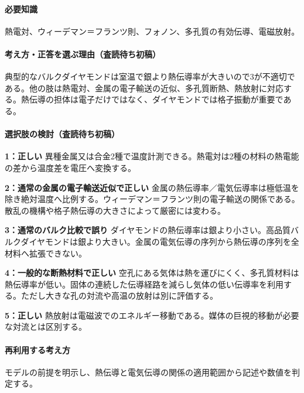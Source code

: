 \paragraph{必要知識} 熱電対、ウィーデマン＝フランツ則、フォノン、多孔質の有効伝導、電磁放射。

\paragraph{考え方・正答を選ぶ理由（査読待ち初稿）} 典型的なバルクダイヤモンドは室温で銀より熱伝導率が大きいので3が不適切である。他の肢は熱電対、金属の電子輸送の近似、多孔質断熱、熱放射に対応する。熱伝導の担体は電子だけではなく、ダイヤモンドでは格子振動が重要である。

\paragraph{選択肢の検討（査読待ち初稿）}\mbox{}\par

\noindent\textbf{1：正しい} 異種金属又は合金2種で温度計測できる。熱電対は2種の材料の熱電能の差から温度差を電圧へ変換する。\par

\noindent\textbf{2：通常の金属の電子輸送近似で正しい} 金属の熱伝導率／電気伝導率は極低温を除き絶対温度へ比例する。ウィーデマン＝フランツ則の電子輸送の関係である。散乱の機構や格子熱伝導の大きさによって厳密には変わる。\par

\noindent\textbf{3：通常のバルク比較で誤り} ダイヤモンドの熱伝導率は銀より小さい。高品質バルクダイヤモンドは銀より大きい。金属の電気伝導の序列から熱伝導の序列を全材料へ拡張できない。\par

\noindent\textbf{4：一般的な断熱材料で正しい} 空孔にある気体は熱を運びにくく、多孔質材料は熱伝導率が低い。固体の連続した伝導経路を減らし気体の低い伝導率を利用する。ただし大きな孔の対流や高温の放射は別に評価する。\par

\noindent\textbf{5：正しい} 熱放射は電磁波でのエネルギー移動である。媒体の巨視的移動が必要な対流とは区別する。\par

\paragraph{再利用する考え方} モデルの前提を明示し、熱伝導と電気伝導の関係の適用範囲から記述や数値を判定する。

